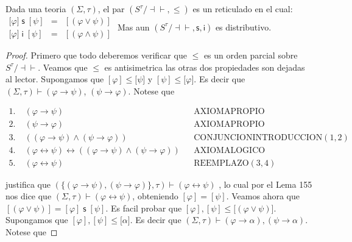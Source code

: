   \begin{lemma}
    Dada una teoria \((\Sigma ,\tau )\), el par \((S^{\tau }/\mathrm{\dashv \vdash } ,\leq )\) es un reticulado en el cual:
    \(\displaystyle \begin{array}{rcl} \lbrack \varphi ]\;\mathsf{s\;}[\psi ] & =& [(\varphi \vee \psi )] \\ \lbrack \varphi ]\;\mathsf{i\;}[\psi ] & =& [(\varphi \wedge \psi )] \end{array} \)
    Mas aun \((S^{\tau }/\mathrm{\dashv \vdash },\mathsf{s},\mathsf{i})\) es distributivo.
  \end{lemma}
  \begin{proof}
    Primero que todo deberemos verificar que \(\leq \) es un orden parcial sobre \( S^{\tau }/\dashv \vdash \). Veamos que \(\leq \) es antisimetrica las otras dos propiedades son dejadas al lector. Supongamos que \([\varphi ]\leq \lbrack \psi ]\) y \([\psi ]\leq \lbrack \varphi ].\) Es decir que \((\Sigma ,\tau )\vdash \left( \varphi \rightarrow \psi \right) \), \(\left( \psi \rightarrow \varphi \right) .\) Notese que

    \(\displaystyle \begin{array}{llll} 1.\; & \left( \varphi \rightarrow \psi \right) & & \text{AXIOMAPROPIO} \\ 2.\; & \left( \psi \rightarrow \varphi \right) & & \text{AXIOMAPROPIO} \\ 3.\; & ((\varphi \rightarrow \psi )\wedge (\psi \rightarrow \varphi )) & & \text{CONJUNCIONINTRODUCCION}(1,2) \\ 4.\; & (\varphi \leftrightarrow \psi )\leftrightarrow ((\varphi \rightarrow \psi )\wedge (\psi \rightarrow \varphi )) & & \text{AXIOMALOGICO} \\ 5.\; & (\varphi \leftrightarrow \psi ) & & \text{REEMPLAZO}(3,4) \end{array} \)

    justifica que \((\{\left( \varphi \rightarrow \psi \right) ,\left( \psi \rightarrow \varphi \right) \},\tau )\vdash (\varphi \leftrightarrow \psi )\) , lo cual por el Lema 155 nos dice que \((\Sigma ,\tau )\vdash (\varphi \leftrightarrow \psi )\), obteniendo \([\varphi ]=[\psi ].\)
    Veamos ahora que \([(\varphi \vee \psi )]=[\varphi ]\;\mathsf{s\;}[\psi ].\) Es facil probar que \([\varphi ],[\psi ]\leq \lbrack (\varphi \vee \psi )].\) Supongamos que \([\varphi ],[\psi ]\leq \lbrack \alpha ].\) Es decir que \( (\Sigma ,\tau )\vdash (\varphi \rightarrow \alpha ),(\psi \rightarrow \alpha ).\) Notese que


\end{proof}
